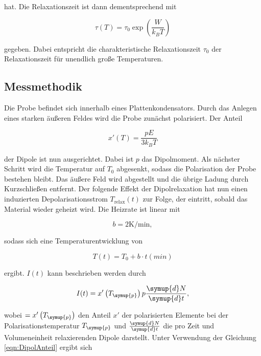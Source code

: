 hat. Die Relaxationszeit ist dann dementsprechend mit 

\begin{equation*}
    \tau\left(T\right) = \tau_0 \exp{\left(\frac{W}{k_B T}\right)}
\end{equation*}

gegeben. Dabei entspricht die charakteristische Relaxationszeit $\tau_0$ der Relaxationszeit für unendlich große Temperaturen. 

\subsection{Messmethodik}

Die Probe befindet sich innerhalb eines Plattenkondensators. Durch das Anlegen eines starken äußeren Feldes wird die Probe zunächst 
polarisiert. Der Anteil 

\begin{equation}
    x'\left(T\right) = \frac{pE}{3k_BT}
    \label{eqn:DipolAnteil}
\end{equation}

der Dipole ist nun ausgerichtet. Dabei ist $p$ das Dipolmoment. Als nächster Schritt wird die Temperatur auf $T_0$ abgesenkt, sodass die Polarisation der 
Probe bestehen bleibt. Das äußere Feld wird abgestellt und die übrige Ladung durch Kurzschließen entfernt. Der folgende Effekt der Dipolrelaxation
hat nun einen induzierten Depolarisationsstrom $T_\text{relax}\left(t\right)$ zur Folge, der eintritt, sobald das Material wieder geheizt wird. 
Die Heizrate ist linear mit 

\begin{equation*}
    b = 2 \si{\kelvin\per\minute},
\end{equation*}

sodass sich eine Temperaturentwicklung von

\begin{equation*}
    T(t) = T_0 + b\cdot t(min)
\end{equation*}

ergibt. $I(t)$ kann beschrieben werden durch 

\begin{equation*}
    I(t) = x'\left(T_{\symup{p}}\right)p\frac{\symup{d}N}{\symup{d}t},
\end{equation*}

wobei $ = x'\left(T_{\symup{p}}\right)$ den Anteil $x'$ der polarisierten Elemente bei der Polarisationstemperatur $T_{\symup{p}}$ und $\frac{\symup{d}N}{\symup{d}t}$ 
die pro Zeit und Volumeneinheit relaxierenden Dipole darstellt. Unter Verwendung der Gleichung \eqref{eqn:DipolAnteil} ergibt sich

